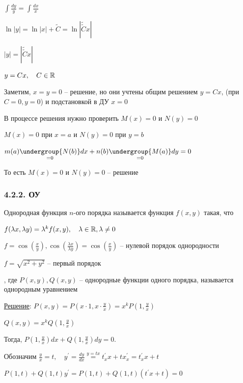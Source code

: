 \documentclass[12pt]{article}
\begin{document}
    $\int \frac{dy}{y} = \int \frac{dx}{x}$

    $\ln|y| = \ln|x| + \tilde{C} = \ln|\tilde{\tilde{C}}x|$

    $|y| = |\tilde{\tilde{C}}x|$

    $y = Cx, \quad C \in \mathbb{R}$

    Заметим, $x = y = 0$ -- решение, но они учтены общим решением $y = Cx$, (при $C = 0, y = 0$) и подстановкой в ДУ $x = 0$

    \Nota В процессе решения нужно проверить $M(x) = 0$ и $N(y) = 0$

    $M(x) = 0$ при $x = a$ и $N(y) = 0$ при $y = b$

    $m(a)\underset{=0}{\undergroup{N(b)}}dx + n(b)\underset{=0}{\undergroup{M(a)}}dy = 0$

    То есть $M(x) = 0$ и $N(y) = 0$ -- решение

    \hypertarget{homogeneousequation}{}

    \subsubsection{4.2.2. ОУ}

     Однородная функция $n$-ого порядка называется функция $f(x, y)$ такая, что

    $f(\lambda x, \lambda y) = \lambda^k f(x, y), \quad \lambda \in \mathbb{R}, \lambda \neq 0$

    \Exs $f = \cos\left(\frac{x}{y}\right), \cos\left(\frac{\lambda x}{\lambda y}\right) = \cos\left(\frac{x}{y}\right)$ -- нулевой порядок однородности

    $f = \sqrt{x^2 + y^2}$ -- первый порядок

     , где $P(x, y), Q(x, y)$ -- однородные функции одного порядка, называется однородным уравнением

    \underline{Решение}: $P(x, y) = P\left(x \cdot 1, x \cdot \frac{y}{x}\right) = x^k P\left(1, \frac{y}{x}\right)$

    $Q(x, y) = x^k Q\left(1, \frac{y}{x}\right)$

    Тогда, $P\left(1, \frac{y}{x}\right)dx + Q\left(1, \frac{y}{x}\right)dy = 0$.

    Обозначим $\frac{y}{x} = t, \quad y^\prime = \frac{dy}{dx} \stackrel{y = tx}{=} t^\prime_x x + t x^\prime_x = t^\prime_x x + t$

    $P(1, t) + Q(1, t)y^\prime = P(1, t) + Q(1, t)(t^\prime x + t) = 0$
\end{document}
